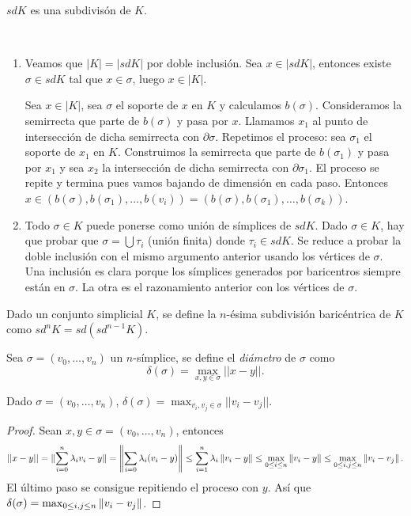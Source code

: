 \documentclass[HS.tex]{subfiles}
\begin{document}
\begin{prop}
$sd K$ es una subdivisón de $K$.
\end{prop}
\begin{dem}\
\begin{enumerate}
\item Veamos que $|K|=|sd K|$ por doble inclusión.
Sea $x \in |sdK|$, entonces existe $σ \in sd K$ tal que $x \in σ$, luego $x \in |K|$.

Sea $x \in |K|$, sea $σ$ el soporte de $x$ en $K$ y calculamos $b(σ)$. Consideramos la semirrecta que parte de $b(\sigma)$ y pasa por $x$. Llamamos $x_1$ al punto de intersección de dicha semirrecta con $\partial\sigma$. Repetimos el proceso: sea $\sigma_1$ el soporte de $x_1$ en $K$. Construimos la semirrecta que parte de $b(\sigma_1)$ y pasa por $x_1$ y sea $x_2$ la intersección de dicha semirrecta con $\partial\sigma_1$. El proceso se repite y termina pues vamos bajando de dimensión en cada paso. Entonces $x\in (b(\sigma),b(\sigma_1),\dots, b(v_i))=(b(\sigma),b(\sigma_1),\dots,b(\sigma_k))$. 

\item Todo $\sigma\in K$ puede ponerse como unión de símplices de $sdK$. Dado $\sigma\in K$, hay que probar que $\sigma=\bigcup \tau_i$ (unión finita) donde $\tau_i\in sdK$. Se reduce a probar la doble inclusión con el mismo argumento anterior usando los vértices de $\sigma$. Una inclusión es clara porque los símplices generados por baricentros siempre están en $\sigma$. La otra es el razonamiento anterior con los vértices de $\sigma$.
\end{enumerate}
\QED
\end{dem}

\begin{defi}
Dado un conjunto simplicial $K$, se define la $n$-ésima subdivisión baricéntrica de $K$ como $sd^nK=sd(sd^{n-1}K)$.
\end{defi}

\begin{defi}
Sea $\sigma=(v_0,\dots, v_n)$ un $n$-símplice, se define el \emph{diámetro} de $\sigma$ como 
\[
\delta(\sigma)=\max_{x,y\in\sigma}||x-y||.
\]
\end{defi}

\begin{lemma}
Dado $\sigma=(v_0,\dots,v_n)$, $\delta(\sigma)=\max_{v_i,v_j\in\sigma}||v_i-v_j||$.
\end{lemma}
\begin{proof}
Sean $x,y\in\sigma=(v_0,\dots, v_n)$, entonces 
\[
||x-y||= \lVert\sum_{i=0}^n\lambda_iv_i-y\rVert=\left\lVert\sum_{i=0}\lambda_i(v_i-y)\right\rVert\leq\sum_{i=1}^n\lambda_i\left\lVert v_i-y\right\rVert\leq \max_{0\leq i\leq n}\left\lVert v_i-y\right\rVert\leq\max_{0\leq i,j\leq n}\left\lVert v_i-v_j\right\rVert.
\]
El último paso se consigue repitiendo el proceso con $y$. Así que $\delta(\sigma)=\max_{0\leq i,j\leq n}\left\lVert v_i-v_j\right\rVert$.
\end{proof}
\end{document}
